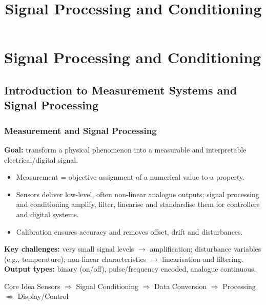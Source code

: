 \title[Signal Processing and Conditioning]{Signal Processing and Conditioning}
\section{Signal Processing and Conditioning}  

\subsection{Introduction to Measurement Systems and Signal Processing}
\begin{frame}
	\frametitle{Measurement and Signal Processing}
	\small
	\textbf{Goal:} transform a physical phenomenon into a measurable and interpretable electrical/digital signal.
	\begin{itemize}
		\item Measurement = objective assignment of a numerical value to a property.
		\item Sensors deliver low-level, often non-linear analogue outputs; signal processing and conditioning amplify, filter, linearise and standardise them for controllers and digital systems.
		\item Calibration ensures accuracy and removes offset, drift and disturbances.
	\end{itemize}
	\textbf{Key challenges:} very small signal levels $\rightarrow$ amplification; disturbance variables (e.g., temperature); non-linear characteristics $\rightarrow$ linearisation and filtering.\\[1mm]
	\textbf{Output types:} binary (on/off), pulse/frequency encoded, analogue continuous.
	\begin{block}{Core Idea}
		Sensors $\Rightarrow$ Signal Conditioning $\Rightarrow$ Data Conversion $\Rightarrow$ Processing $\Rightarrow$ Display/Control
	\end{block}
\end{frame}

